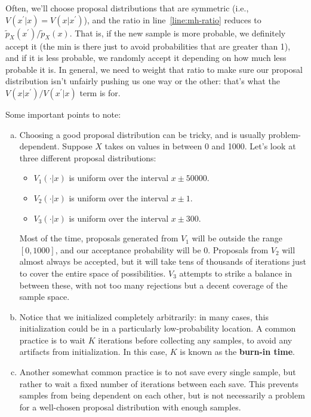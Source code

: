 \documentclass[12pt]{article}
\newcommand{\tp}{\widetilde{p}}
\begin{document}
    Often, we'll choose proposal distributions that are symmetric (i.e.,
    $V(x^\prime|x) = V(x|x^\prime)$), and the ratio in line~\ref{line:mh-ratio}
    reduces to $\tp_X(x^\prime)/\tp_X(x)$.  That is, if the new sample is more
    probable, we definitely accept it (the min is there just to avoid
    probabilities that are greater than 1), and if it is less probable, we
    randomly accept it depending on how much less probable it is. In general,
    we need to weight that ratio to make sure our proposal distribution isn't
    unfairly pushing us one way or the other: that's what the
    $V(x|x^\prime)/V(x^\prime|x)$ term is for.

    Some important points to note:
    \begin{enumerate}[(a)]
        \item Choosing a good proposal distribution can be tricky, and is
            usually problem-dependent. Suppose $X$ takes on values in between 0
            and 1000. Let's look at three different proposal distributions:
            \begin{itemize}
                \item $V_1(\cdot | x)$ is uniform over the interval $x \pm 50000$.
                \item $V_2(\cdot | x)$ is uniform over the interval $x \pm 1$.
                \item $V_3(\cdot | x)$ is uniform over the interval $x \pm 300$.
            \end{itemize}
            Most of the time, proposals generated from $V_1$ will be outside
            the range $[0,1000]$, and our acceptance probability will be 0.
            Proposals from $V_2$ will almost always be accepted, but it will
            take tens of thousands of iterations just to cover the entire
            space of possibilities. $V_3$ attempts to strike a balance in
            between these, with not too many rejections but a decent coverage
            of the sample space.
        \item Notice that we initialized completely arbitrarily: in many cases,
            this initialization could be in a particularly low-probability
            location. A common practice is to wait $K$ iterations before
            collecting any samples, to avoid any artifacts from initialization.
            In this case, $K$ is known as the \textbf{burn-in time}.
        \item Another somewhat common practice is to not save every single
            sample, but rather to wait a fixed number of iterations between
            each save. This prevents samples from being dependent on each
            other, but is not necessarily a problem for a well-chosen proposal
            distribution with enough samples.
    \end{enumerate}
\end{document}
